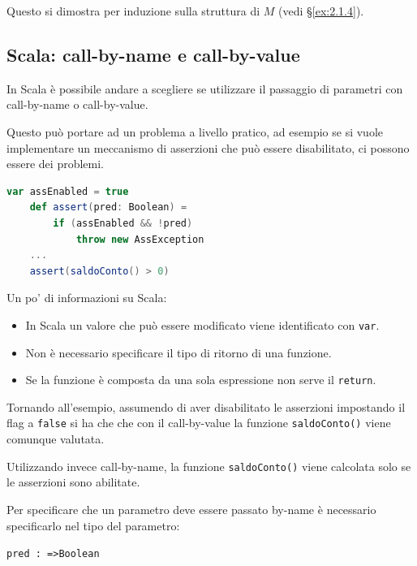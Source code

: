 Questo si dimostra per induzione sulla struttura di $M$ (vedi §\ref{ex:2.1.4}). 

\subsection{Scala: call-by-name e call-by-value}

In Scala è possibile andare a scegliere se utilizzare il passaggio di parametri con call-by-name o call-by-value.

Questo può portare ad un problema a livello pratico, ad esempio se si vuole implementare un meccanismo di asserzioni che può essere disabilitato, ci possono essere dei problemi.

\begin{lstlisting}[language=Scala]
	var assEnabled = true
	def assert(pred: Boolean) = 
		if (assEnabled && !pred)
			throw new AssException
	...
	assert(saldoConto() > 0)
\end{lstlisting}

\noindent Un po' di informazioni su Scala:
\begin{itemize}
	\item In Scala un valore che può essere modificato viene identificato con \texttt{var}.
	\item Non è necessario specificare il tipo di ritorno di una funzione.
	\item Se la funzione è composta da una sola espressione non serve il \texttt{return}.
\end{itemize}

\noindent Tornando all'esempio, assumendo di aver disabilitato le asserzioni impostando il flag a \texttt{false} si ha che che con il call-by-value la funzione \texttt{saldoConto()} viene comunque valutata.

Utilizzando invece call-by-name, la funzione \texttt{saldoConto()} viene calcolata solo se le asserzioni sono abilitate.

Per specificare che un parametro deve essere passato by-name è necessario specificarlo nel tipo del parametro:

\begin{center}
\texttt{pred : =>Boolean}
\end{center}